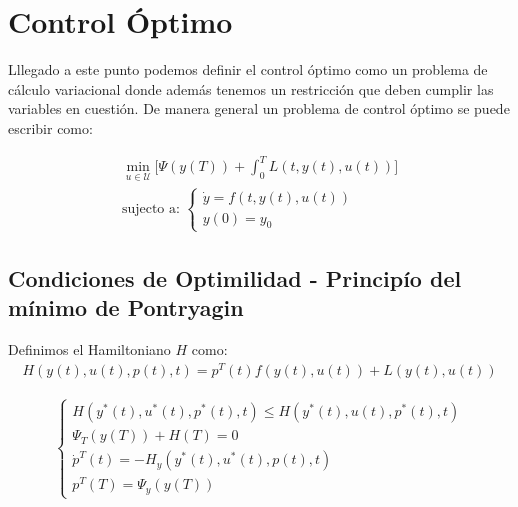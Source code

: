 \section{Control Óptimo}

Lllegado a este punto podemos definir el control óptimo como un problema de cálculo variacional donde además tenemos un restricción que deben cumplir las variables en cuestión. De manera general un problema de control óptimo se puede escribir como:

\begin{gather}
    \min_{u \in \mathcal{U} } \Big[ \Psi(y(T)) + \int_0^T L (t,y(t),u(t)) \Big] \\
    \text{sujecto a: } \begin{cases}
        \dot{y} = f(t,y(t),u(t)) \\
        y(0) = y_0
    \end{cases} 
\end{gather}

\subsection{Condiciones de Optimilidad - Principío del mínimo de Pontryagin}

Definimos el Hamiltoniano $H$ como:
\begin{gather}
    H(y(t),u(t),p(t),t) = p^T(t)f(y(t),u(t)) + L(y(t),u(t))
\end{gather}

\begin{gather}
    \begin{cases}
        H(y^*(t),u^*(t),p^*(t),t) \leq  H(y^*(t),u(t),p^*(t),t) \\
        \Psi_T(y(T)) + H(T) = 0 \\
        \dot{p}^T(t) = -H_y(y^*(t),u^*(t),p(t),t) \\
        p^T(T) = \Psi_y(y(T)) 
   \end{cases}
\end{gather}
